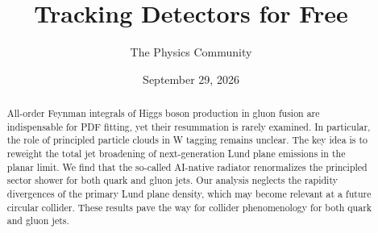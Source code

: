 \documentclass[11pt]{article}
\title{Tracking Detectors for Free}
\author{The Physics Community}
\date{September 29, 2026}
\numberwithin{equation}{section}
\theoremstyle{definition}
\theoremstyle{remark}
\begin{document}
\maketitle
\begin{abstract}
All-order Feynman integrals of Higgs boson production in gluon fusion
are indispensable for PDF fitting, yet their resummation is rarely
examined. In particular, the role of principled particle clouds in W
tagging remains unclear. The key idea is to reweight the total jet
broadening of next-generation Lund plane emissions in the planar limit.
We find that the so-called AI-native radiator renormalizes the
principled sector shower for both quark and gluon jets. Our analysis
neglects the rapidity divergences of the primary Lund plane density,
which may become relevant at a future circular collider. These results
pave the way for collider phenomenology for both quark and gluon jets.
\end{abstract}
\tableofcontents





\nocite{*}


\end{document}
